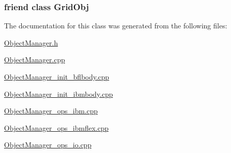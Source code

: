 \subsubsection[{\texorpdfstring{Grid\+Obj}{GridObj}}]{\setlength{\rightskip}{0pt plus 5cm}friend class {\bf Grid\+Obj}\hspace{0.3cm}{\ttfamily [friend]}}\hypertarget{class_object_manager_a55cfec1721fb1b9d9e7592bd6288c998}{}\label{class_object_manager_a55cfec1721fb1b9d9e7592bd6288c998}


The documentation for this class was generated from the following files\+:\begin{DoxyCompactItemize}
\item 
\hyperlink{_object_manager_8h}{Object\+Manager.\+h}\item 
\hyperlink{_object_manager_8cpp}{Object\+Manager.\+cpp}\item 
\hyperlink{_object_manager__init__bflbody_8cpp}{Object\+Manager\+\_\+init\+\_\+bflbody.\+cpp}\item 
\hyperlink{_object_manager__init__ibmbody_8cpp}{Object\+Manager\+\_\+init\+\_\+ibmbody.\+cpp}\item 
\hyperlink{_object_manager__ops__ibm_8cpp}{Object\+Manager\+\_\+ops\+\_\+ibm.\+cpp}\item 
\hyperlink{_object_manager__ops__ibmflex_8cpp}{Object\+Manager\+\_\+ops\+\_\+ibmflex.\+cpp}\item 
\hyperlink{_object_manager__ops__io_8cpp}{Object\+Manager\+\_\+ops\+\_\+io.\+cpp}\end{DoxyCompactItemize}
